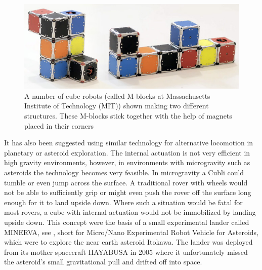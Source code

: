 \begin{figure}[H] 
	\centering
	\includegraphics[scale=0.4]{figures/m-blocks}
	\caption{A number of cube robots (called M-blocks at Massachusetts Institute of Technology (MIT)) shown making two different structures. These M-blocks stick together with the help of magnets placed in their corners\cite{LRosen}}
	\label{MBlocksExample}
\end{figure}

It has also been suggested using similar technology for alternative locomotion in planetary or asteroid exploration. The internal actuation is not very efficient in high gravity environments, however, in environments with microgravity such as asteroids the technology becomes very feasible. In microgravity a Cubli could tumble or even jump across the surface. A traditional rover with wheels would not be able to sufficiently grip or might even push the rover off the surface long enough for it to land upside down. Where such a situation would be fatal for most rovers, a cube with internal actuation would not be immobilized by landing upside down.
This concept were the basis of a small experimental lander called MINERVA, see , short for Micro/Nano Experimental Robot Vehicle for Asteroids, which were to explore the near earth asteroid Itokawa. The lander was deployed from its mother spacecraft HAYABUSA in 2005 where it unfortunately missed the asteroid's small gravitational pull and drifted off into space.

